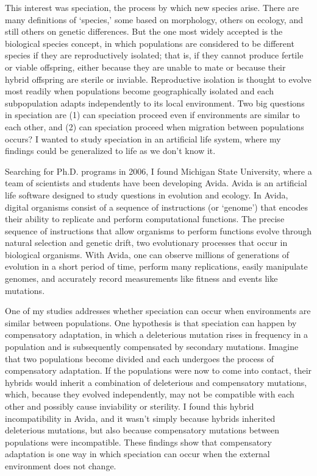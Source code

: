 \documentclass[12pt]{article}
\begin{document}
This interest was speciation, the process by which new species arise.
%
There are many definitions of `species,' some based on morphology,
others on ecology, and still others on genetic differences.
%
But the one most widely accepted is the biological species concept,
in which populations are considered to be different species
if they are reproductively isolated;
that is, if they cannot produce fertile or viable offspring,
either because they are unable to mate
or because their hybrid offspring are sterile or inviable.
%
Reproductive isolation is thought to evolve most readily
when populations become geographically isolated and
each subpopulation adapts independently to its local environment.
%
Two big questions in speciation are
(1) can speciation proceed even if environments are similar to each other,
and (2) can speciation proceed when migration between populations occurs?
%
I wanted to study speciation in an artificial life system,
where my findings could be generalized to life as we don't know it.



Searching for Ph.D. programs in 2006, I found Michigan State University,
where a team of scientists and students have been developing Avida.
%
Avida is an artificial life software
designed to study questions in evolution and ecology.
%
In Avida, digital organisms consist of a sequence of instructions (or `genome')
that encodes their ability to replicate and perform computational functions.
%
The precise sequence of instructions that
allow organisms to perform functions
evolve through natural selection and genetic drift,
two evolutionary processes that occur in biological organisms.
%
With Avida, one can observe millions of generations
of evolution in a short period of time,
perform many replications, easily manipulate genomes,
and accurately record measurements like fitness and events like mutations.



One of my studies addresses whether speciation
can occur when environments are similar between populations.
%
One hypothesis is that speciation can happen by compensatory adaptation,
in which a deleterious mutation rises in frequency in a population
and is subsequently compensated by secondary mutations.
%
Imagine that two populations become divided
and each undergoes the process of compensatory adaptation.
%
If the populations were now to come into contact,
their hybrids would inherit a combination of
deleterious and compensatory mutations,
which, because they evolved independently,
may not be compatible with each other
and possibly cause inviability or sterility.
%
I found this hybrid incompatibility in Avida,
and it wasn't simply because hybrids inherited
deleterious mutations, but also because
compensatory mutations between populations were incompatible.
%
These findings show that compensatory adaptation is
one way in which speciation can occur when
the external environment does not change.
\end{document}
